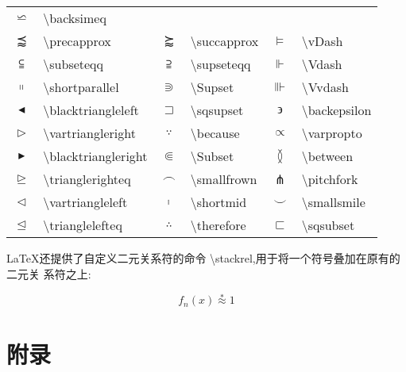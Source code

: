 \documentclass[a4paper]{ctexart}
\begin{document}
\begin{table}
\begin{tabular}{clclcl}
        $\backsimeq$            & \textbackslash backsimeq                                                              \\
        $\precapprox$           & \textbackslash precapprox         & $\succapprox$     & \textbackslash succapprox     &
        $\vDash$                & \textbackslash vDash                                                                  \\
        $\subseteqq$            & \textbackslash subseteqq          & $\supseteqq$      & \textbackslash supseteqq      &
        $\Vdash$                & \textbackslash Vdash                                                                  \\
        $\shortparallel$        & \textbackslash shortparallel      & $\Supset$         & \textbackslash Supset         &
        $\Vvdash$               & \textbackslash Vvdash                                                                 \\
        $\blacktriangleleft$    & \textbackslash blacktriangleleft  & $\sqsupset$       & \textbackslash sqsupset       &
        $\backepsilon$          & \textbackslash backepsilon                                                            \\
        $\vartriangleright$     & \textbackslash vartriangleright   & $\because$        & \textbackslash because        &
        $\varpropto$            & \textbackslash varpropto                                                              \\
        $\blacktriangleright$   & \textbackslash blacktriangleright & $\Subset$         & \textbackslash Subset         &
        $\between$              & \textbackslash between                                                                \\
        $\trianglerighteq$      & \textbackslash trianglerighteq    & $\smallfrown$     & \textbackslash smallfrown     &
        $\pitchfork$            & \textbackslash pitchfork                                                              \\
        $\vartriangleleft$      & \textbackslash vartriangleleft    & $\shortmid$       & \textbackslash shortmid       &
        $\smallsmile$           & \textbackslash smallsmile                                                             \\
        $\trianglelefteq$       & \textbackslash trianglelefteq     & $\therefore$      & \textbackslash therefore      &
        $\sqsubset$             & \textbackslash sqsubset                                                               \\
        \bottomrule
        \end{tabular}
    \end{table}
    \flushleft
    \LaTeX 还提供了自定义二元关系符的命令 \textbackslash stackrel,用于将一个符号叠加在原有的二元关 系符之上:\par
    \[
        f_n(x) \stackrel{*}{\approx} 1    
    \]

    \newpage
    \appendix
    \section{附录}
\end{document}
